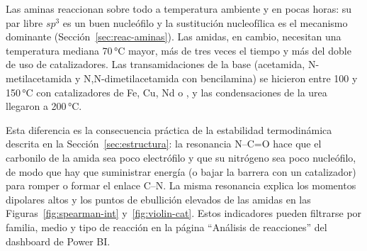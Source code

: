 Las aminas reaccionan sobre todo a temperatura ambiente y en pocas horas:
su par libre $sp^3$ es un buen nucleófilo y la sustitución nucleofílica es
el mecanismo dominante (Sección~\ref{sec:reac-aminas}). Las amidas, en
cambio, necesitan una temperatura mediana 70\,\si{\degreeCelsius} mayor,
más de tres veces el tiempo y más del doble de uso de catalizadores. Las
transamidaciones de la base (acetamida, N-metilacetamida y
N,N-dimetilacetamida con bencilamina) se hicieron entre 100 y
150\,\si{\degreeCelsius} con catalizadores de Fe, Cu, Nd o , y las
condensaciones de la urea llegaron a 200\,\si{\degreeCelsius}.

Esta diferencia es la consecuencia práctica de la estabilidad
termodinámica descrita en la Sección~\ref{sec:estructura}: la resonancia
N--C=O hace que el carbonilo de la amida sea poco electrófilo y que su
nitrógeno sea poco nucleófilo, de modo que hay que suministrar energía (o
bajar la barrera con un catalizador) para romper o formar el enlace C--N.
La misma resonancia explica los momentos dipolares altos y los puntos de
ebullición elevados de las amidas en las Figuras~\ref{fig:spearman-int} y~\ref{fig:violin-cat}. Estos
indicadores pueden filtrarse por familia, medio y tipo de reacción en la
página ``Análisis de reacciones'' del dashboard de Power BI.
